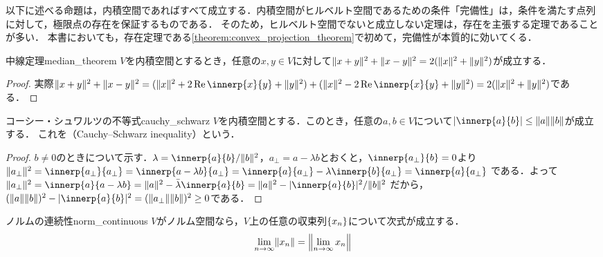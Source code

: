 \documentclass[../../main]{subfiles}
\begin{document}
\begin{note}
  以下に述べる命題は，内積空間であればすべて成立する．内積空間がヒルベルト空間であるための条件「完備性」は，条件を満たす点列に対して，極限点の存在を保証するものである．
  そのため，ヒルベルト空間でないと成立しない定理は，存在を主張する定理であることが多い．
  本書においても，存在定理である\cref{theorem:convex_projection_theorem}で初めて，完備性が本質的に効いてくる．
\end{note}

\begin{theorem}{中線定理}{median_theorem}
  \(V\)を内積空間とするとき，任意の\(x,y\in V\)に対して\(\vnorm{x+y}^2+\vnorm{x-y}^2=2(\vnorm{x}^2+\vnorm{y}^2)\)が成立する．
\end{theorem}

\begin{proof}
  実際\(\vnorm{x+y}^2+\vnorm{x-y}^2=(\vnorm{x}^2+2\rpart\innerp{x}{y}+\vnorm{y}^2)+(\vnorm{x}^2-2\rpart\innerp{x}{y}+\vnorm{y}^2)=2(\vnorm{x}^2+\vnorm{y}^2)\)である．
\end{proof}

\begin{theorem}{コーシー・シュワルツの不等式}{cauchy_schwarz}
  \(V\)を内積空間とする．このとき，任意の\(a,b\in V\)について\(\abs{\innerp{a}{b}}\leq\vnorm{a}\vnorm{b}\)が成立する．
  これを（Cauchy–Schwarz inequality）という．
\end{theorem}

\begin{proof}
  \(b\neq 0\)のときについて示す．\(\lambda=\innerp{a}{b}/\vnorm{b}^2\)，\(a_{\mathord{\perp}}=a-\lambda b\)とおくと，\(\innerp{a_{\mathord{\perp}}}{b}=0\)より
  \(
    \vnorm{a_{\mathord{\perp}}}^2 = \innerp{a_{\mathord{\perp}}}{a_{\mathord{\perp}}}
    = \innerp{a-\lambda b}{a_{\mathord{\perp}}}
    = \innerp{a}{a_{\mathord{\perp}}} - \lambda\innerp{b}{a_{\mathord{\perp}}}
    = \innerp{a}{a_{\mathord{\perp}}}
  \)
  である．よって
  \(
    \vnorm{a_{\mathord{\perp}}}^2 = \innerp{a}{a-\lambda b}
    = \vnorm{a}^2-\conj{\lambda}\innerp{a}{b}
    = \vnorm{a}^2-\abs{\innerp{a}{b}}^2/\vnorm{b}^2
  \)
  だから，\((\vnorm{a}\vnorm{b})^2-\abs{\innerp{a}{b}}^2=(\vnorm{a_{\mathord{\perp}}}\vnorm{b})^2\geq 0\)である．
\end{proof}

\begin{proposition}{ノルムの連続性}{norm_continuous}
  \(V\)がノルム空間なら，\(V\)上の任意の収束列\(\seq{x_n}\)について次式が成立する．
  \[
    \lim_{n\to\infty}\vnorm{x_n} = \vnorm*{\lim_{n\to\infty}x_n}
  \]
\end{proposition}
\end{document}
